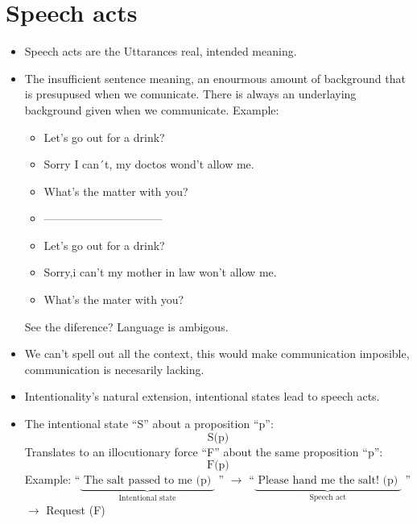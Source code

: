 \section{Speech acts}
\begin{itemize}
    \item Speech acts are the Uttarances real, intended meaning.
    \item The insufficient sentence meaning, an enourmous amount of background that is presupused when we comunicate. There is always an underlaying background given when we communicate. 
    \newline 
    Example: 
        \begin{itemize}
            \item Let's go out for a drink?
            \item Sorry I can´t, my doctos wond't allow me.
            \item What's the matter with you? 
            \item --------------------------------
            \item Let's go out for a drink?
            \item Sorry,i can't my mother in law won't allow me.
            \item What's the mater with you?
        \end{itemize}
        See the diference? Language is ambigous.
    
    \item We can't spell out all the context, this would make communication imposible, communication is necesarily lacking.
    \item Intentionality's natural extension, intentional states lead to speech acts.
    \item The intentional state ``S'' about a proposition ``p'':
        \[
          \text{ S(p) }
        \]
        Translates to an illocutionary force ``F'' about the same proposition ``p'':
        \[
          \text{ F(p) }
        \]
        Example: ``$\underbrace{\text{ The salt passed to me (p) }}_{\text{ Intentional state }}$ '' $\rightarrow$ ``$\underbrace{\text{ Please hand me the salt! (p) }}_{\text{ Speech act }}$ '' $\rightarrow$ Request (F)
\end{itemize}



